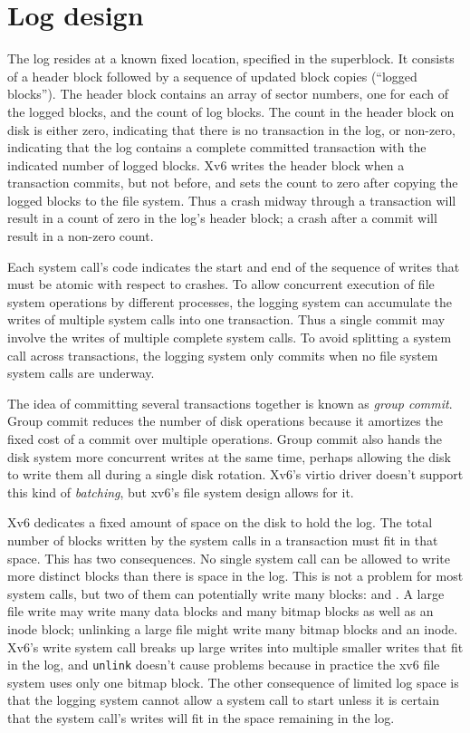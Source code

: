 \section{Log design}

The log resides at a known fixed location, specified in the superblock.
It consists of a header block followed by a sequence
of updated block copies (``logged blocks'').
The header block contains an array of sector
numbers, one for each of the logged blocks, and 
the count of log blocks.
The count in the header block on disk is either
zero, indicating that there is no transaction in the log,
or non-zero, indicating that the log contains a complete committed
transaction with the indicated number of logged blocks.
Xv6 writes the header
block when a transaction commits, but not before, and sets the
count to zero after copying the logged blocks to the file system.
Thus a crash midway through a transaction will result in a
count of zero in the log's header block; a crash after a commit
will result in a non-zero count.

Each system call's code indicates the start and end of the sequence of
writes that must be atomic with respect to crashes.
To allow concurrent execution of file system operations
by different processes,
the logging system can accumulate the writes
of multiple system calls into one transaction.
Thus a single commit may involve the writes of multiple
complete system calls.
To avoid splitting a system call across transactions, the logging system
only commits when no file system system calls are underway.

The idea of committing several transactions together is known as 
\textit{group commit}.
Group commit reduces the number of disk operations
because it amortizes the fixed cost of a commit over multiple
operations.
Group commit also hands the disk system more concurrent writes
at the same time, perhaps allowing the disk to write
them all during a single disk rotation.
Xv6's virtio driver doesn't support this kind of
\textit{batching},
but xv6's file system design allows for it.

Xv6 dedicates a fixed amount of space on the disk to hold the log.
The total number of blocks written by the system calls in a
transaction must fit in that space.
This has two consequences.
No single system call
can be allowed to write more distinct blocks than there is space
in the log. This is not a problem for most system calls, but two
of them can potentially write many blocks: 
and
.
A large file write may write many data blocks and many bitmap blocks
as well as an inode block; unlinking a large file might write many
bitmap blocks and an inode.
Xv6's write system call breaks up large writes into multiple smaller
writes that fit in the log,
and 
\lstinline{unlink}
doesn't cause problems because in practice the xv6 file system uses
only one bitmap block.
The other consequence of limited log space
is that the logging system cannot allow a system call to start
unless it is certain that the system call's writes will
fit in the space remaining in the log.
